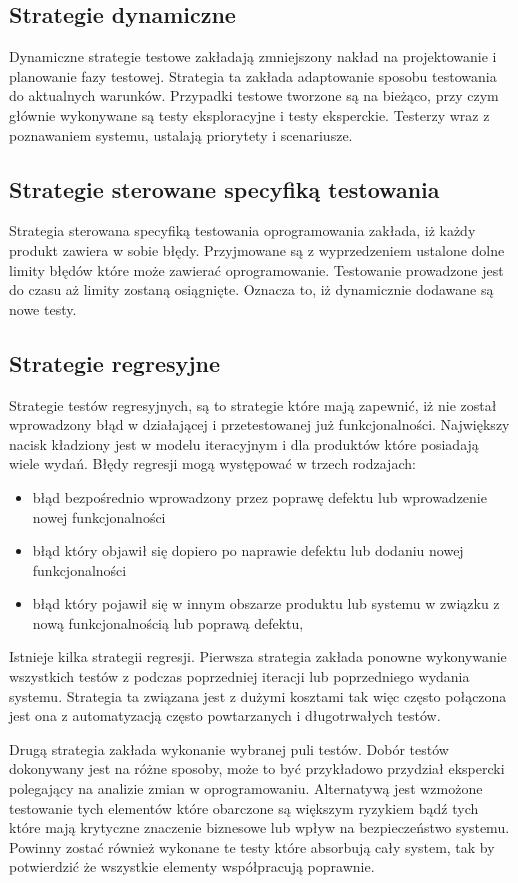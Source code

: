 \subsection{Strategie dynamiczne}
Dynamiczne strategie testowe zakładają zmniejszony nakład na projektowanie i planowanie fazy testowej. Strategia ta zakłada adaptowanie sposobu testowania do aktualnych warunków. Przypadki testowe tworzone są na bieżąco, przy czym głównie wykonywane są testy eksploracyjne i testy eksperckie. Testerzy wraz z poznawaniem systemu, ustalają priorytety i scenariusze.
\subsection{Strategie sterowane specyfiką testowania}
Strategia sterowana specyfiką testowania oprogramowania zakłada, iż każdy produkt zawiera w sobie błędy. Przyjmowane są z wyprzedzeniem ustalone dolne limity błędów które może zawierać oprogramowanie. Testowanie prowadzone jest do czasu aż limity zostaną osiągnięte. Oznacza to, iż dynamicznie dodawane są nowe testy.
\subsection{Strategie regresyjne}
Strategie testów regresyjnych, są to strategie które mają zapewnić, iż nie został wprowadzony błąd w działającej i przetestowanej już funkcjonalności. Największy nacisk kładziony jest w modelu iteracyjnym i dla produktów które posiadają wiele wydań. Błędy regresji mogą występować w trzech rodzajach:
\begin{itemize}
  \item błąd bezpośrednio wprowadzony przez poprawę defektu lub wprowadzenie nowej funkcjonalności
  \item błąd który objawił się dopiero po naprawie defektu lub dodaniu nowej funkcjonalności
  \item  błąd który pojawił się w innym obszarze produktu lub systemu w związku z nową funkcjonalnością lub poprawą defektu,
\end{itemize}


Istnieje kilka strategii regresji. Pierwsza strategia zakłada ponowne wykonywanie wszystkich testów z podczas poprzedniej iteracji lub poprzedniego wydania systemu. Strategia ta związana jest z dużymi kosztami tak więc często połączona jest ona z automatyzacją często powtarzanych i długotrwałych testów. 

Drugą strategia zakłada wykonanie wybranej puli testów. Dobór testów dokonywany jest na różne sposoby, może to być przykładowo przydział ekspercki polegający na analizie zmian w oprogramowaniu. Alternatywą jest wzmożone testowanie tych elementów które obarczone są większym ryzykiem bądź tych które mają krytyczne znaczenie biznesowe lub wpływ na bezpieczeństwo systemu. Powinny zostać również wykonane te testy które absorbują cały system, tak by potwierdzić że wszystkie elementy współpracują poprawnie.

